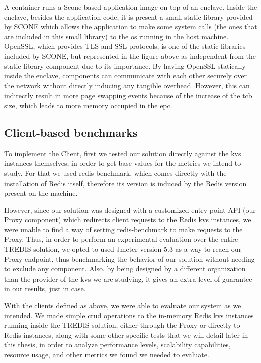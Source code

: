 A container runs a Scone-based application image on top of an enclave. Inside the enclave, besides the application code, it is present a small static library provided by SCONE which allows the application to make some system calls (the ones that are included in this small library) to the \gls{os} running in the host machine. OpenSSL, which provides TLS and SSL protocols, is one of the static libraries included by SCONE, but represented in the figure above as independent from the static library component due to its importance. By having OpenSSL statically inside the enclave, components can communicate with each other securely over the network without directly inducing any tangible overhead. However, this can indirectly result in more page swapping events because of the increase of the \gls{tcb} size, which leads to more memory occupied in the \gls{epc}.



\subsection{Client-based benchmarks}

To implement the Client, first we tested our solution directly against the \gls{kvs} instances themselves, in order to get base values for the metrics we intend to study. For that we used redis-benchmark, which comes directly with the installation of Redis itself, therefore its version is induced by the Redis version present on the machine.

However, since our solution was designed with a customized entry point API (our Proxy component) which redirects client requests to the Redis \gls{kvs} instances, we were unable to find a way of setting redis-benchmark to make requests to the Proxy. 
Thus, in order to perform an experimental evaluation over the entire TREDIS solution, we opted to used Jmeter version 5.3 as a way to reach our Proxy endpoint, thus benchmarking the behavior of our solution without needing to exclude any component. Also, by being designed by a different organization than the provider of the \gls{kvs} we are studying, it gives an extra level of guarantee in our results, just in case.

With the clients defined as above, we were able to evaluate our system as we intended. 
We made simple \gls{crud} operations to the in-memory Redis \gls{kvs} instances running inside the TREDIS solution, either through the Proxy or directly to Redis instances, along with some other specific tests that we will detail later in this thesis, in order to analyze performance levels, scalability capabilities, resource usage, and other metrics we found we needed to evaluate.



